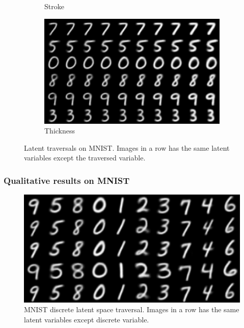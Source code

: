 \documentclass[10pt,mathserif]{beamer}
\begin{document}
\begin{frame}
\begin{figure}[bp]
\begin{subfigure}[t]{0.48\linewidth}
\caption{Stroke}
\end{subfigure}\hspace{0.005\linewidth}
\begin{subfigure}[t]{0.48\linewidth}
\centering
\includegraphics[width=0.8\linewidth]{mnist_thickness.png}
\caption{Thickness}
\end{subfigure}
\caption{ Latent traversals on MNIST. Images in a row has the same latent variables except the traversed variable.}
\end{figure}
\end{frame}

\begin{frame}
\frametitle{Qualitative results on MNIST}
\begin{figure}[bp]
\centering
\includegraphics[width=0.8\linewidth]{mnist_digit.png}
\caption{MNIST discrete latent space traversal. Images in a row has the same latent variables except discrete variable.}
\end{figure}
\end{frame}
\end{document}

